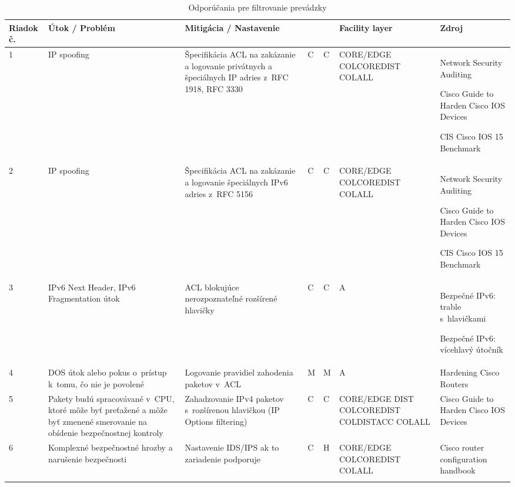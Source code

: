 \begin{longtable}[!htbp]{|C{2.5em}L{9em}L{9em}C{2em}C{2.5em}C{7.5em}L{10em}|}

	\hline
	\centering
	
	Riadok č.	&Útok / Problém	&Mitigácia / Nastavenie	& 	&	&Facility layer	&Zdroj\\
	\endhead
	

	 1	&IP spoofing	&Špecifikácia ACL na zakázanie a logovanie privátnych a špeciálnych IP adries z~RFC 1918, RFC 3330	&C	&C	&CORE/EDGE
	COLCOREDIST
	COLALL	&Network Security Auditing \cite{Jackson2010}
	
	Cisco Guide to Harden Cisco IOS Devices \cite{Singh2018}
	
	CIS Cisco IOS 15 Benchmark \cite{CIS_DrTLsgXv24lxeIIM}\\
	2	&IP spoofing	&Špecifikácia ACL na zakázanie a logovanie špeciálnych IPv6 adries z~RFC 5156	&C	&C	&CORE/EDGE
	COLCOREDIST
	COLALL	&Network Security Auditing \cite{Jackson2010}
	
	Cisco Guide to Harden Cisco IOS Devices \cite{Singh2018}
	
	CIS Cisco IOS 15 Benchmark \cite{CIS_DrTLsgXv24lxeIIM}\\
	 3	&IPv6 Next Header,
	IPv6 Fragmentation útok	&ACL blokujúce nerozpoznateľné rozšírené hlavičky	&C	&C	&A	&Bezpečné IPv6: trable s~hlavičkami \cite{Podermanski1922015}
	
	Bezpečné IPv6: vícehlavý útočník \cite{Gregr2622015}\\
	4	&DOS útok alebo pokus o~prístup k~tomu, čo nie je povolené	&Logovanie pravidiel zahodenia paketov v~ACL	&M	&M	&A	&Hardening Cisco Routers \cite{Akin2002}\\
	 5	&Pakety budú spracovávané v~CPU, ktoré môže byť preťažené a môže byť zmenené smerovanie na obídenie bezpečnostnej kontroly	&Zahadzovanie IPv4 paketov s~rozšírenou hlavičkou (IP Options filtering)	&C	&C	&CORE/EDGE
	DIST
	COLCOREDIST
	COLDISTACC
	COLALL	&Cisco Guide to Harden Cisco IOS Devices \cite{Singh2018}\\
	6	&Komplexné bezpečnostné hrozby a narušenie bezpečnosti	&Nastavenie IDS/IPS ak to zariadenie podporuje	&C	&H	&CORE/EDGE COLCOREDIST
	COLALL	&Cisco router configuration handbook \cite{Hucaby2010}\\
	\hline
\caption{Odporúčania pre filtrovanie prevádzky}
\label{tab:filtering}%
\end{longtable}%

